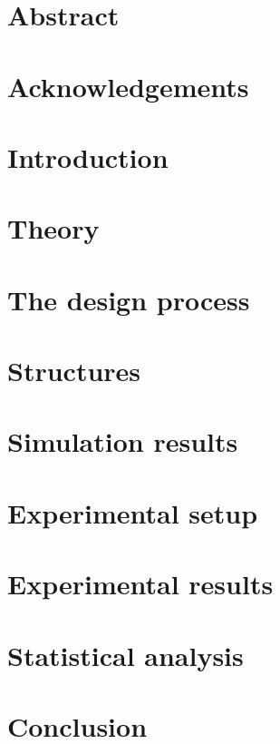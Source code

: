 \documentclass[aps,prb,longbibliography,eqsecnum,a4paper,amssymb,groupedaddress]{revtex4-1}
\begin{document}


\section*{Abstract}

\section*{Acknowledgements}


\newpage
\tableofcontents
\newpage
\section{Introduction}
\setcounter{page}{1}



\section{Theory}



\section{The design process}


\section{Structures}


\section{Simulation results}



\section{Experimental setup}


\section{Experimental results}





\section{Statistical analysis}

\section{Conclusion}



%
\newpage


\newpage

\end{document}
